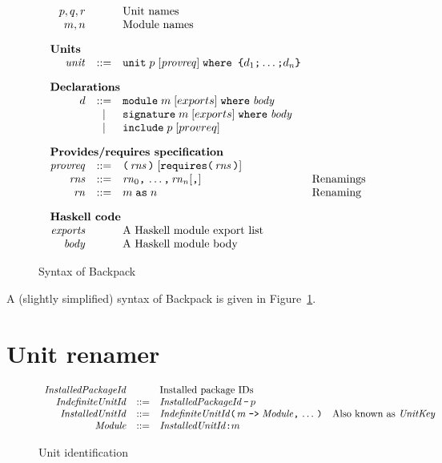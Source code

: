 \documentclass{article}
\newcommand{\I}[1]{\ensuremath{\mathit{#1}}}
\begin{document}
\begin{figure}[htpb]
$$
\begin{array}{rcll}
p,q,r && \mbox{Unit names} \\
m,n   && \mbox{Module names} \\[1em]
\multicolumn{3}{l}{\mbox{\bf Units}} \\
  \I{unit} & ::= & \verb|unit|\; p\; [\I{provreq}]\; \verb|where {| d_1 \verb|;| \ldots \verb|;| d_n \verb|}| \\[1em]
\multicolumn{3}{l}{\mbox{\bf Declarations}} \\
  d & ::= & \verb|module|\;    m \; [exports]\; \verb|where|\; \I{body} \\
    & |   & \verb|signature|\; m \; [exports]\; \verb|where|\; \I{body} \\
    & |   & \verb|include|\; p \; [provreq] \\[1em]
\multicolumn{3}{l}{\mbox{\bf Provides/requires specification}} \\
\I{provreq} & ::= & \verb|(| \, \I{rns} \, \verb|)| \; 
        [ \verb|requires(|\, \I{rns} \, \verb|)| ] \\
\I{rns} & ::= & \I{rn}_0 \verb|,| \, \ldots \verb|,| \, \I{rn}_n [\verb|,|] & \mbox{Renamings} \\
\I{rn} & ::= & m\; \verb|as| \; n & \mbox{Renaming} \\[1em] 
\multicolumn{3}{l}{\mbox{\bf Haskell code}} \\
\I{exports} & & \mbox{A Haskell module export list} \\
\I{body}    & & \mbox{A Haskell module body} \\
\end{array}
$$
\caption{Syntax of Backpack} \label{fig:syntax}
\end{figure}

A (slightly simplified) syntax of Backpack is given in Figure~\ref{fig:syntax}.

\newpage
\section{Unit renamer}

\begin{figure}[htpb]
$$
\begin{array}{rcll}
  \I{InstalledPackageId} &  & \mbox{Installed package IDs} \\
  \I{IndefiniteUnitId} & ::= & \I{InstalledPackageId}\, \verb|-|\, p  \\
  \I{InstalledUnitId} & ::= & \I{IndefiniteUnitId} \verb|(| \, m \; \verb|->| \; \I{Module} \verb|,|\, \ldots\, \verb|)| & \mbox{Also known as \I{UnitKey}} \\
  \I{Module} & ::= & \I{InstalledUnitId} \verb|:| m \\
\end{array}
$$
\caption{Unit identification} \label{fig:ids}
\end{figure}
\end{document}
